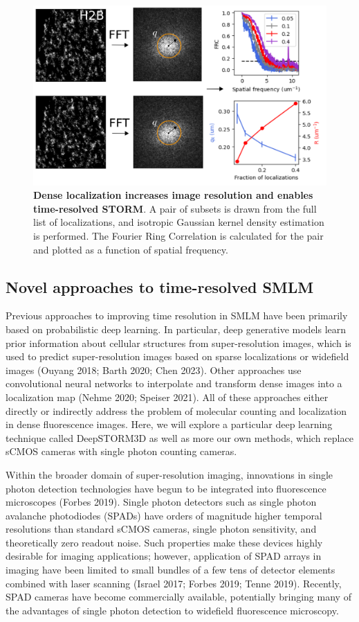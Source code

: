 \documentclass{ucetd}
\begin{document}
\begin{figure}
\begin{center}
\includegraphics[width=13cm]{FRC.png}
\end{center}
\caption{\textbf{Dense localization increases image resolution and enables time-resolved STORM}. A pair of subsets is drawn from the full list of localizations, and isotropic Gaussian kernel density estimation is performed. The Fourier Ring Correlation is calculated for the pair and plotted as a function of spatial frequency.}
\end{figure}


\subsection{Novel approaches to time-resolved SMLM}

Previous approaches to improving time resolution in SMLM have been primarily based on probabilistic deep learning. In particular, deep generative models learn prior information about cellular structures from super-resolution images, which is used to predict super-resolution images based on sparse localizations or widefield images (Ouyang 2018; Barth 2020; Chen 2023). Other approaches use convolutional neural networks to interpolate and transform dense images into a localization map (Nehme 2020; Speiser 2021). All of these approaches either directly or indirectly address the problem of molecular counting and localization in dense fluorescence images. Here, we will explore a particular deep learning technique called DeepSTORM3D as well as more our own methods, which replace sCMOS cameras with single photon counting cameras. 

Within the broader domain of super-resolution imaging, innovations in single photon detection technologies have begun to be integrated into fluorescence microscopes (Forbes 2019). Single photon detectors such as single photon avalanche photodiodes (SPADs) have orders of magnitude higher temporal resolutions than standard sCMOS cameras, single photon sensitivity, and theoretically zero readout noise. Such properties make these devices highly desirable for imaging applications; however, application of SPAD arrays in imaging have been limited to small bundles of a few tens of detector elements combined with laser scanning (Israel 2017; Forbes 2019; Tenne 2019). Recently, SPAD cameras have become commercially available, potentially bringing many of the advantages of single photon detection to widefield fluorescence microscopy. 
\end{document}
